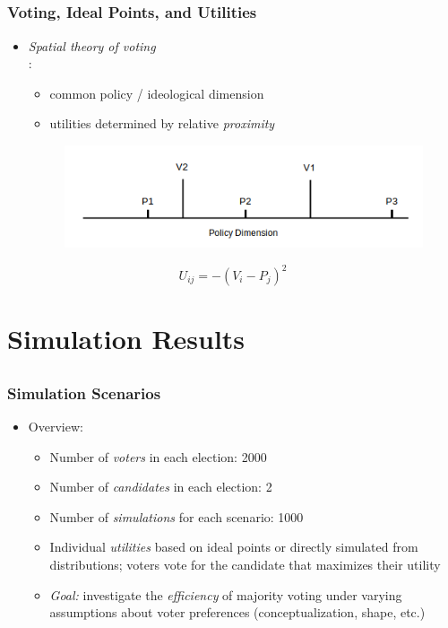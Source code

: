 \documentclass{beamer}
\begin{document}
\subsection{}
\begin{frame}%
\frametitle{Voting, Ideal Points, and Utilities}
\begin{itemize}
  \item \emph{Spatial theory of voting}\\\citep[e.g.][]{downs1957economic,enelow1984spatial}:
  \begin{itemize}
     \item common policy / ideological dimension
     \item utilities determined by relative \emph{proximity}
   \end{itemize}
  \begin{figure}[b]\centering
      \includegraphics[width=.8\textwidth]{../paper/ideal_plot.png}
  \end{figure}
  \end{itemize}
  $$ U_{ij} = -(V_i - P_j)^2 $$
\end{frame}

\section{Simulation Results}
\subsection{}
\begin{frame}%
  \frametitle{Simulation Scenarios}
  \begin{itemize}
    \item Overview:
    \begin{itemize}
      \item Number of \emph{voters} in each election: 2000
      \item Number of \emph{candidates} in each election: 2
      \item Number of \emph{simulations} for each scenario: 1000
      \item Individual \emph{utilities} based on ideal points or directly simulated from distributions; voters vote for the candidate that maximizes their utility
      \item \emph{Goal:} investigate the \emph{efficiency} of majority voting under varying assumptions about voter preferences (conceptualization, shape, etc.)
    \end{itemize}
  \end{itemize}
\end{frame}
\end{document}
